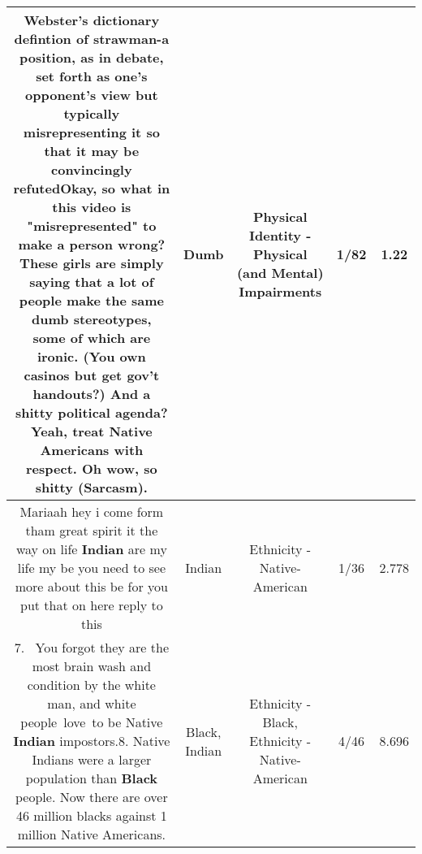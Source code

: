 \documentclass[11pt]{article}
\newlength\mylength
\begin{document}
\begin{center}
\begin{longtable}{|C{.65\mylength}|C{.30\mylength}|C{.12\mylength}|C{.12\mylength}|C{.12\mylength}|}
  \small Webster's dictionary defintion of strawman-a position, as in debate, set forth as one's opponent's view but typically misrepresenting it so that it may be convincingly refutedOkay, so what in this video is "misrepresented" to make a person wrong? These girls are simply saying that a lot of people make the same \textbf{dumb} stereotypes, some of which are ironic. (You own casinos but get gov't handouts?) And a shitty political agenda? Yeah, treat Native Americans with respect. Oh wow, so shitty (Sarcasm).\normalsize   & Dumb & Physical Identity - Physical (and Mental) Impairments & 1/82 & 1.22 \\  \hline
  \small Mariaah hey i come form tham  great spirit it the way on life \textbf{Indian} are my life  my be you need to see more about this be for you put that on here reply to this\normalsize   & Indian & Ethnicity - Native-American & 1/36 & 2.778 \\  \hline
  \small 7.  You forgot they are the most brain wash and condition by the white man, and white people love to be Native \textbf{Indian} impostors.8. Native Indians were a larger population than \textbf{Black} people. Now there are over 46 million blacks against 1 million Native Americans.\normalsize   & Black, Indian & Ethnicity - Black, Ethnicity - Native-American & 4/46 & 8.696 \\  \hline

\end{longtable}
\end{center}
\end{document}
